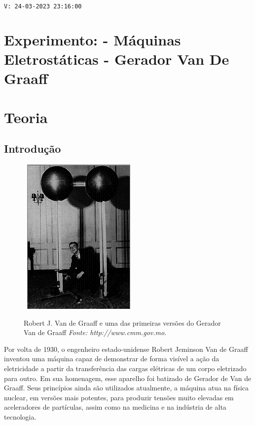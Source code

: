 \noindent \texttt{V: 24-03-2023 23:16:00}

\section*{Experimento: - Máquinas Eletrostáticas - Gerador Van De Graaff}

\section*{Teoria}
\subsection*{Introdução}

\begin{figure}
\
\includegraphics[width=1.0\linewidth]{img/rj-vandegraaff.png} 
	\caption{Robert J. Van de Graaff e uma das primeiras versões do Gerador Van de Graaff \textit{Fonte: http://www.cmm.gov.mo}.}
	\label{fig:robert-j-vgraaff}
\end{figure}
Por volta de 1930, o engenheiro estado-unidense Robert Jeminson Van de Graaff inventou uma 
máquina capaz de demonstrar de forma visível a ação da eletricidade a partir da transferência das 
cargas elétricas de um corpo eletrizado para outro. Em sua homenagem, esse aparelho foi batizado
de Gerador de Van de Graaff. Seus princípios ainda são utilizados atualmente, a máquina atua na 
física nuclear, em versões mais potentes, para produzir tensões muito elevadas em aceleradores de 
partículas, assim como na medicina e na indústria de alta tecnologia.

